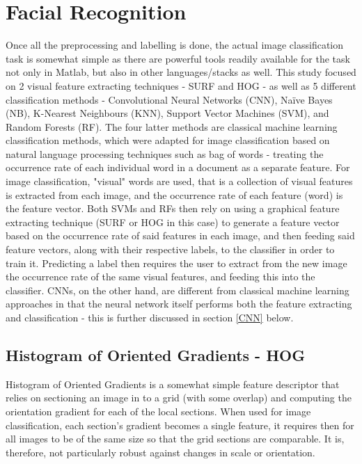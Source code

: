 \documentclass[11pt]{article}
\begin{document}
\section{Facial Recognition}\label{sec:facial_recognition}
    Once all the preprocessing and labelling is done, the actual image classification task is somewhat simple as there are powerful tools readily available for the task not only in Matlab, but also in other languages/stacks as well. This study focused on 2 visual feature extracting techniques - SURF and HOG - as well as 5 different classification methods - Convolutional Neural Networks (CNN), Naïve Bayes (NB), K-Nearest Neighbours (KNN), Support Vector Machines (SVM), and Random Forests (RF). The four latter methods are classical machine learning classification methods, which were adapted for image classification based on natural language processing techniques such as bag of words - treating the occurrence rate of each individual word in a document as a separate feature. For image classification, "visual" words are used, that is a collection of visual features is extracted from each image, and the occurrence rate of each feature (word) is the feature vector. Both SVMs and RFs then rely on using a graphical feature extracting technique (SURF or HOG in this case) to generate a feature vector based on the occurrence rate of said features in each image, and then feeding said feature vectors, along with their respective labels, to the classifier in order to train it. Predicting a label then requires the user to extract from the new image the occurrence rate of the same visual features, and feeding this into the classifier. CNNs, on the other hand, are different from classical machine learning approaches in that the neural network itself performs both the feature extracting and classification - this is further discussed in section \ref{CNN} below.

    \subsection{Histogram of Oriented Gradients - HOG}
        Histogram of Oriented Gradients is a somewhat simple feature descriptor that relies on sectioning an image in to a grid (with some overlap) and computing the orientation gradient for each of the local sections. When used for image classification, each section's gradient becomes a single feature, it requires then for all images to be of the same size so that the grid sections are comparable. It is, therefore, not particularly robust against changes in scale or orientation.
\end{document}
